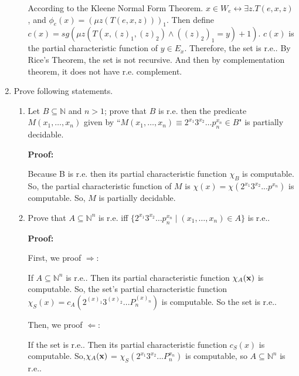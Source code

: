\documentclass[12pt,a4paper]{article}
\theoremstyle{definition}
\numberwithin{equation}{section}
\numberwithin{figure}{section}
\begin{document}
\begin{enumerate}
\begin{enumerate}
    According to the Kleene Normal Form Theorem. $x \in W_e \leftrightarrow  \exists z.T(e, x, z)$, and $\phi_e(x) = (\mu z(T(e, x, z)))_1$. 
    Then define $c(x) = sg(\mu z(T (x, (z)_1, (z)_2) \wedge ((z)_2)_1 = y) + 1)$. $c(x)$ is the partial characteristic function of $y \in E_x$. Therefore, the set is r.e..
By Rice’s Theorem, the set is not recursive. And then by complementation theorem, it does not have r.e. complement.
  
  
  \end{enumerate}

\item Prove following statements.
\begin{enumerate}
\item Let $B\subseteq\mathbb{N}$ and $n>1$; prove that $B$ is r.e. then the predicate $M(x_1,\ldots,x_n)$ given by ``$M(x_1,\ldots,x_n)\equiv2^{x_1}3^{x_2}\ldots p_n^{x_n}\in B$" is partially decidable.

\textbf{Proof:}

Because B is r.e. then its partial characteristic function $\chi_B$ is computable. So, the partial characteristic function of $M$ is $\chi(x) = \chi (2^{x_1} 3^{x_2} . . . p^{x_n} )$ is computable. So, $M$ is partially decidable.

\item Prove that $A\subseteq\mathbb{N}^n$ is r.e. iff $\{2^{x_1}3^{x_2}\ldots p_n^{x_n} \mid (x_1,\ldots,x_n)\in A\}$ is r.e..

\textbf{Proof:}

First, we proof $\Rightarrow$:

If $A \subseteq \mathbb{N}^n$ is r.e.. Then its partial characteristic function $\chi_A(\bf{x})$ is computable. So, the set's partial characteristic function $\chi_S(x) = c_A(2^{(x)_1}3^{(x)_2}...P_n^{(x)_n})$ is computable. So the set is r.e..

Then, we proof $\Leftarrow$:

If the set is r.e.. Then its partial characteristic function $c_S(x)$ is computable. So,$\chi_A(\bf{x})$ = $\chi_S(2^{x_1}3^{x_2}...P_n^{x_n})$ is computable, so $A \subseteq \mathbb{N}^n$ is r.e..


\end{enumerate}



\end{enumerate}
\end{document}
